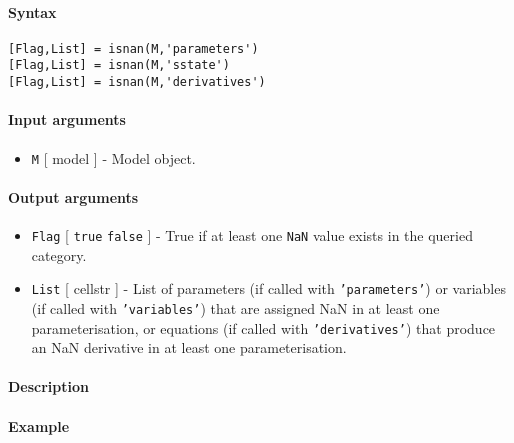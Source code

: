


	\paragraph{Syntax}\label{syntax}

\begin{verbatim}
[Flag,List] = isnan(M,'parameters')
[Flag,List] = isnan(M,'sstate')
[Flag,List] = isnan(M,'derivatives')
\end{verbatim}

\paragraph{Input arguments}\label{input-arguments}

\begin{itemize}
\itemsep1pt\parskip0pt
\item
  \texttt{M} {[} model {]} - Model object.
\end{itemize}

\paragraph{Output arguments}\label{output-arguments}

\begin{itemize}
\item
  \texttt{Flag} {[} \texttt{true} \textbar{} \texttt{false} {]} - True
  if at least one \texttt{NaN} value exists in the queried category.
\item
  \texttt{List} {[} cellstr {]} - List of parameters (if called with
  \texttt{'parameters'}) or variables (if called with
  \texttt{'variables'}) that are assigned NaN in at least one
  parameterisation, or equations (if called with \texttt{'derivatives'})
  that produce an NaN derivative in at least one parameterisation.
\end{itemize}

\paragraph{Description}\label{description}

\paragraph{Example}\label{example}


